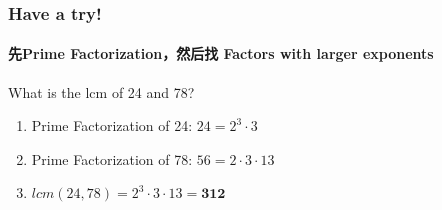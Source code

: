 \documentclass[
	11pt, %
]{beamer}
\begin{document}

\begin{frame}
	\frametitle{Have a try!}
	\framesubtitle{先Prime Factorization，然后找 Factors with larger exponents}
		What is the lcm of 24 and 78?
		 \pause
		 \begin{enumerate}
		 	\item Prime Factorization of 24: $24=2^3 \cdot 3$ \pause
		 	\item Prime Factorization of 78: $56=2 \cdot 3 \cdot 13$ \pause
		 	\item  $lcm(24, 78) = 2^3 \cdot 3 \cdot 13 = \textbf{312}$ 
		 	\end{enumerate}
\end{frame}

\end{document}
